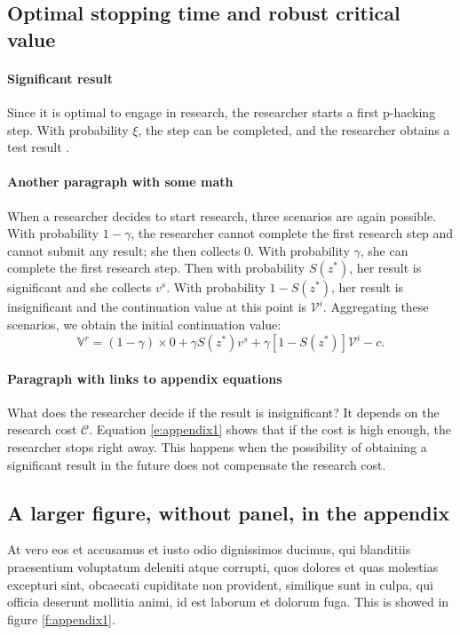 \documentclass[letterpaper,12pt,leqno]{article}
\begin{document}
\subsection{Optimal stopping time and robust critical value}

\paragraph{Significant result} Since it is optimal to engage in research, the researcher starts a first p-hacking step. With probability $\xi$, the step can be completed, and the researcher obtains a test result \citep{MS22a}.

\paragraph{Another paragraph with some math} When a researcher decides to start research, three scenarios are again possible. With probability $1-\gamma$, the researcher cannot complete the first research step and cannot submit any result; she then collects $0$. With probability $\gamma$, she can complete the first research step. Then with probability $S(z^*)$, her result is significant and she collects $v^s$. With probability $1-S(z^*)$, her result is insignificant and the continuation value at this point is $\mathcal{V}^i$. Aggregating these scenarios, we obtain the initial continuation value:
\begin{equation}
\mathbb{V}^r = (1-\gamma) \times 0 +\gamma S(z^*) v^s+\gamma [1-S(z^*)] \mathcal{V}^i-c.
\label{e:appendix1}\end{equation}


\paragraph{Paragraph with links to appendix equations} What does the researcher decide if the result is insignificant? It depends on the research cost $\mathcal{C}$. Equation \eqref{e:appendix1} shows that if the cost is high enough, the researcher stops right away. This happens when the possibility of obtaining a significant result in the future does not compensate the research cost.

\subsection{A larger figure, without panel, in the appendix} 

At vero eos et accusamus et iusto odio dignissimos ducimus, qui blanditiis praesentium voluptatum deleniti atque corrupti, quos dolores et quas molestias excepturi sint, obcaecati cupiditate non provident, similique sunt in culpa, qui officia deserunt mollitia animi, id est laborum et dolorum fuga. This is showed in figure \ref{f:appendix1}.
\end{document}
